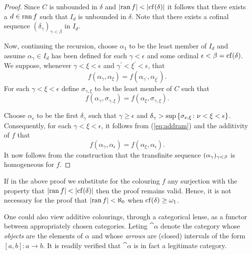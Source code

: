 \begin{proof}
	Since $C$ is unbounded in $\delta$ and $\left\lvert\operatorname{ran} f\right\rvert<\left\lvert\operatorname{cf}(\delta)\right\rvert$
	it follows that there exists a $d\in\operatorname{ran} f$ such that $I_d$ is unbounded
	in $\delta$.  Note that there exists a cofinal sequence
	$(\delta_\gamma)_{\gamma<\beta}$ in $I_d$.

	Now, continuing the recursion, choose $\alpha_1$ to be the least member of
	$I_d$ and assume $\alpha_\gamma\in I_d$ has been defined for each
	$\gamma<\epsilon$ and some ordinal $\epsilon<\beta=\operatorname{cf}(\delta)$.  We
	suppose, whenever $\gamma<\xi<\epsilon$ and
	$\gamma^\prime<\xi^\prime<\epsilon$, that
	\begin{equation}
		f(\alpha_\gamma,\alpha_\xi)=f(\alpha_{\gamma^\prime},\alpha_{\xi^\prime}).
	\end{equation}
	For each $\gamma<\xi<\epsilon$ define $\sigma_{\gamma,\xi}$ to be the least
	member of $C$ such that
	\begin{equation}\label{eq:addram}
		f(\alpha_\gamma,\sigma_{\gamma,\xi})=f(\alpha_\xi,\sigma_{\gamma,\xi}).
	\end{equation}

	Choose $\alpha_\epsilon$ to be the first $\delta_\gamma$ such that
	$\gamma\geq\epsilon$ and
	$\delta_\gamma>\sup\left\lbrace \sigma_{\nu,\xi}\colon \nu<\xi<\epsilon \right\rbrace$.
	Consequently, for each $\gamma<\xi<\epsilon$, it follows from
	(\ref{eq:addram}) and the additivity of $f$ that
	\begin{equation}
		f(\alpha_\gamma,\alpha_\epsilon)=f(\alpha_\xi,\alpha_\epsilon).
	\end{equation}
	It now follows from the construction that the transfinite sequence
	$(\alpha_\gamma)_{\gamma<\beta}$ is homogeneous for $f$.
\end{proof}

\begin{rem}
	If in the above proof we substitute for the colouring $f$ any surjection
	with the property that $\left\lvert\operatorname{ran} f\right\rvert<\left\lvert\operatorname{cf}(\delta)\right\rvert$ then the proof
	remains valid.  Hence, it is not necessary for the proof that $\left\lvert\operatorname{ran}
	f\right\rvert<\aleph_0$ when $\operatorname{cf}(\delta)\geq\omega_1$.
\end{rem}

One could also view additive colourings, through a categorical lense, as a
functor between appropriately chosen categories.  Leting $\cat{\alpha}$ denote
the category whose \textit{objects} are the elements of $\alpha$ and whose
\textit{arrows} are (closed) intervals of the form $[a,b]\colon a\to b$.  It is
readily verified that $\cat{\alpha}$ is in fact a legitimate category.

